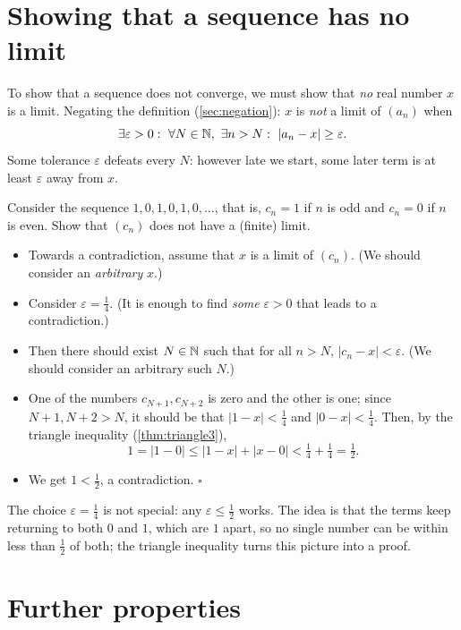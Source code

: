 \section{Showing that a sequence has no limit}\label{sec:no-limit}

To show that a sequence does not converge, we must show that \emph{no} real number $x$ is a limit. Negating the definition
(\cref{sec:negation}): $x$ is \emph{not} a limit of $(a_n)$ when
\[
\exists\varepsilon>0:\ \forall N\in\mathbb{N},\ \exists n>N:\ |a_n-x|\ge\varepsilon.
\]
Some tolerance $\varepsilon$ defeats every $N$: however late we start, some later term is at least $\varepsilon$ away from $x$.

\begin{example}
Consider the sequence $1,0,1,0,1,0,\dots$, that is, $c_n=1$ if $n$ is odd and $c_n=0$ if $n$ is even. Show that $(c_n)$ does
not have a (finite) limit. 
\solution
\begin{itemize}
  \item Towards a contradiction, assume that $x$ is a limit of $(c_n)$. (We should consider an \emph{arbitrary} $x$.)
  \item Consider $\varepsilon=\tfrac14$. (It is enough to find \emph{some} $\varepsilon>0$ that leads to a contradiction.)
  \item Then there should exist $N\in\mathbb{N}$ such that for all $n>N$, $|c_n-x|<\varepsilon$. (We should consider an arbitrary such $N$.)
  \item One of the numbers $c_{N+1},c_{N+2}$ is zero and the other is one; since $N+1,N+2>N$, it should be that
  $|1-x|<\tfrac14$ and $|0-x|<\tfrac14$. Then, by the triangle inequality (\cref{thm:triangle3}),
  \[
  1=|1-0|\le|1-x|+|x-0|<\tfrac14+\tfrac14=\tfrac12.
  \]
  \item We get $1<\tfrac12$, a contradiction. $\square$
\end{itemize}
\end{example}

The choice $\varepsilon=\tfrac14$ is not special: any $\varepsilon\le\tfrac12$ works. The idea is that the terms keep returning to
both $0$ and $1$, which are $1$ apart, so no single number can be within less than $\tfrac12$ of both; the triangle inequality
turns this picture into a proof.

\section{Further properties}\label{sec:limit-props}

